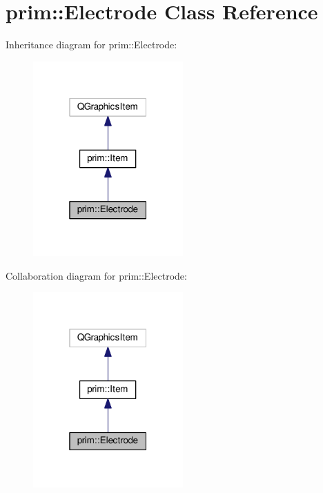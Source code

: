 \hypertarget{classprim_1_1Electrode}{}\section{prim\+:\+:Electrode Class Reference}
\label{classprim_1_1Electrode}


Inheritance diagram for prim\+:\+:Electrode\+:\nopagebreak
\begin{figure}[H]
\begin{center}
\leavevmode
\includegraphics[width=163pt]{classprim_1_1Electrode__inherit__graph}
\end{center}
\end{figure}


Collaboration diagram for prim\+:\+:Electrode\+:\nopagebreak
\begin{figure}[H]
\begin{center}
\leavevmode
\includegraphics[width=163pt]{classprim_1_1Electrode__coll__graph}
\end{center}
\end{figure}
